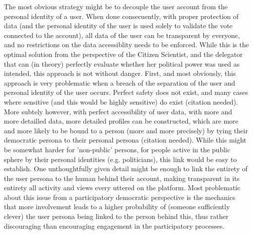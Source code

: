 The most obvious strategy might be to decouple the user account from the personal identity of a user. When done consecuently, with proper protection of data (and the personal identity of the user is used solely to validate the vote connected to the account), all data of the user can be transparent by everyone, and no restrictions on the data accessiblity needs to be enforced. While this is the optimal solution from the perspective of the Citizen Scientist, and the delegator that can (in theory) perfectly evaluate whether her political power was used as intended, this approach is not without danger.
First, and most obviously, this approach is very problematic when a breach of the separation of the user and personal identity of the user occurs. Perfect safety does not exist, and many cases where sensitive (and this would be highly sensitive) do exist (citation needed). More subtely however, with perfect accessibility of user data, with more and more detailled data, more detailed profiles can be constructed, which are more and more likely to be bound to a person (more and more precisely) by tying their democratic persona to their personal persona (citation needed). While this might be somewhat harder for 'non-public' persons, for people active in the public sphere by their personal identities (e.g. politicians), this link would be easy to establish. One unthoughtfully given detail might be enough to link the entirety of the user persona to the human behind their account, making transparent in its entirety all activity and views every uttered on the platform. 
Most problematic about this issue from a participatory democratic perspective is the mechanics that more involvement leads to a higher probability of (someone sufficiently clever) the user persona being linked to the person behind this, thus rather discouraging than encouraging engagement in the participatory processes.

